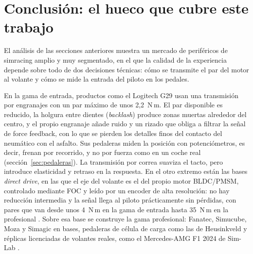 \section{Conclusión: el hueco que cubre este trabajo}
\label{sec:estado-arte-conclusion}

El análisis de las secciones anteriores muestra un mercado de periféricos de simracing amplio y muy segmentado, en el que la calidad de la experiencia depende sobre todo de dos decisiones técnicas: cómo se transmite el par del motor al volante y cómo se mide la entrada del piloto en los pedales.

En la gama de entrada, productos como el Logitech G29 \parencite{logitech_g29} usan una transmisión por engranajes con un par máximo de unos 2,2~N\,m. El par disponible es reducido, la holgura entre dientes (\textit{backlash}) produce zonas muertas alrededor del centro, y el propio engranaje añade ruido y un rizado que obliga a filtrar la señal de force feedback, con lo que se pierden los detalles finos del contacto del neumático con el asfalto. Sus pedaleras miden la posición con potenciómetros, es decir, frenan por recorrido, y no por fuerza como en un coche real (sección~\ref{sec:pedaleras}). La transmisión por correa suaviza el tacto, pero introduce elasticidad y retraso en la respuesta. En el otro extremo están las bases \textit{direct drive}, en las que el eje del volante es el del propio motor BLDC/PMSM, controlado mediante FOC y leído por un encoder de alta resolución: no hay reducción intermedia y la señal llega al piloto prácticamente sin pérdidas, con pares que van desde unos 4~N\,m en la gama de entrada hasta 35~N\,m en la profesional \parencite{moza_web, simucube_web}. Sobre esa base se construye la gama profesional: Fanatec, Simucube, Moza y Simagic en bases, pedaleras de célula de carga como las de Heusinkveld y réplicas licenciadas de volantes reales, como el Mercedes-AMG F1 2024 de Sim-Lab \parencite{simlab_mercedes_f1_2024}.

